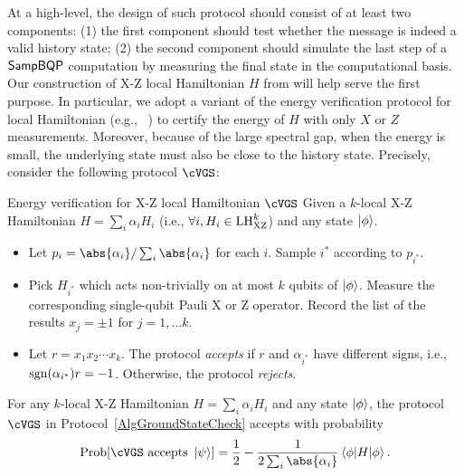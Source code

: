 At a high-level, the design of such protocol should consist of at least two components: (1) the first component should test whether the message is indeed a valid history state; (2) the second component should simulate the last step of a $\operatorname{\mathsf{SampBQP}}$ computation by measuring the final state in the computational basis. 
Our construction of X-Z local Hamiltonian $H$ from  will help serve the first purpose. 
In particular, we adopt a variant of the energy verification protocol for local Hamiltonian (e.g., ~\cite{mf16, PhysRevA.93.022326}) to certify the energy of $H$ with only $X$ or $Z$ measurements.
Moreover, because of the large spectral gap, when the energy is small, the underlying state must also be close to the history state. 
Precisely, consider the following protocol $\cVGS$: 

\begin{protocol}{Energy verification for X-Z local Hamiltonian $\cVGS$} \label{AlgGroundStateCheck}
Given a $k$-local X-Z Hamiltonian 
$H=\sum_i \alpha_{i} H_i$ (i.e., $\forall i, H_i \in \mathrm{LH}_{\mathrm{XZ}}^{k}$) and any state $\ket{\phi}$.

\begin{itemize}
\item Let $p_i= \abs{\alpha_i}/\sum_i \abs{\alpha_i}$ for each $i$. Sample $i^*$ according to $p_{i^*}$. 
\item Pick $H_{i^*}$ which acts non-trivially on at most $k$ qubits of $\ket{\phi}$. Measure the corresponding single-qubit Pauli X or Z operator. 
Record the list of the results $x_j=\pm 1$ for $j=1, \ldots k$. 
\item Let $r=x_1x_2\cdots x_k$. The protocol \emph{accepts} if $r$ and $\alpha_{i^*}$ have different signs, i.e., $\operatorname{sgn}(\alpha_{i^*})r=-1$. Otherwise, the protocol \emph{rejects}. 
\end{itemize}
\end{protocol}

\begin{lem}
	\label{thm:HamCheck}
	For any $k$-local X-Z Hamiltonian $H=\sum_i \alpha_{i} H_i$ and any state $\ket{\phi}$, 
	the protocol $\cVGS$ in Protocol~\ref{AlgGroundStateCheck} accepts with 
	probability
\begin{equation}
 \mathrm{Prob}[ \cVGS \text{ accepts } \ket{\psi}] = \frac{1}{2} - \frac{1}{2 \sum_i \abs{\alpha_i}}\braket{\phi|H|\phi}.
\end{equation}
\end{lem}

